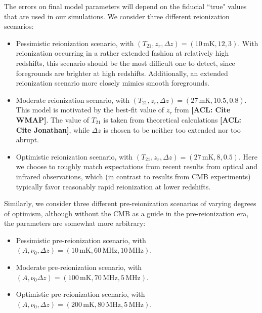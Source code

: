 \documentclass[twolcolumn,apj,iop,numberedappendix]{emulateapj}
\newcommand{\acl}[1]{{\color{red} \textbf{[ACL:  #1]}}}
\begin{document}
The errors on final model parameters will depend on the fiducial ``true" values that are used in our simulations. We consider three different reionization scenarios:
\begin{itemize}
\item Pessimistic reionization scenario, with $(T_{21}, z_r, \Delta z) = (10\,\textrm{mK}, 12, 3) $. With reionization occurring in a rather extended fashion at relatively high redshifts, this scenario should be the most difficult one to detect, since foregrounds are brighter at high redshifts. Additionally, an extended reionization scenario more closely mimics smooth foregrounds.
\item Moderate reionization scenario, with $(T_{21}, z_r, \Delta z) = (27\,\textrm{mK}, 10.5, 0.8) $. This model is motivated by the best-fit value of $z_r$ from \acl{Cite WMAP}. The value of $T_{21}$ is taken from theoretical calculations \acl{Cite Jonathan}, while $\Delta z$ is chosen to be neither too extended nor too abrupt.
\item Optimistic reionization scenario, with $(T_{21}, z_r, \Delta z) = (27\,\textrm{mK}, 8, 0.5) $. Here we choose to roughly match expectations from recent results from optical and infrared observations, which (in contrast to results from CMB experiments) typically favor reasonably rapid reionization at lower redshifts.
\end{itemize}
Similarly, we consider three different pre-reionization scenarios of varying degrees of optimism, although without the CMB as a guide in the pre-reionization era, the parameters are somewhat more arbitrary:
\begin{itemize}
\item Pessimistic pre-reionization scenario, with $(A, \nu_0, \Delta z) = (10\,\textrm{mK}, 60\,\textrm{MHz}, 10\,\textrm{MHz}) $.
\item Moderate pre-reionization scenario, with $(A, \nu_0 \Delta z) = (100\,\textrm{mK}, 70\,\textrm{MHz}, 5\,\textrm{MHz}) $.
\item Optimistic pre-reionization scenario, with $(A, \nu_0, \Delta z) = (200\,\textrm{mK}, 80\,\textrm{MHz}, 5\,\textrm{MHz}) $.
\end{itemize}
\end{document}
